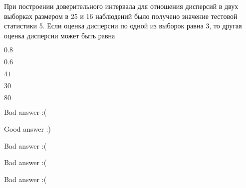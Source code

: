 
\begin{question}
При построении доверительного интервала для отношения дисперсий в двух
выборках размером в 25 и 16 наблюдений было получено значение тестовой
статистики 5. Если оценка дисперсии по одной из выборок равна 3, то
другая оценка дисперсии может быть равна
\begin{answerlist}
  \item \(0.8\)
  \item \(0.6\)
  \item \(41\)
  \item \(30\)
  \item \(80\)
\end{answerlist}
\end{question}

\begin{solution}
\begin{answerlist}
  \item Bad answer :(
  \item Good answer :)
  \item Bad answer :(
  \item Bad answer :(
  \item Bad answer :(
\end{answerlist}
\end{solution}

